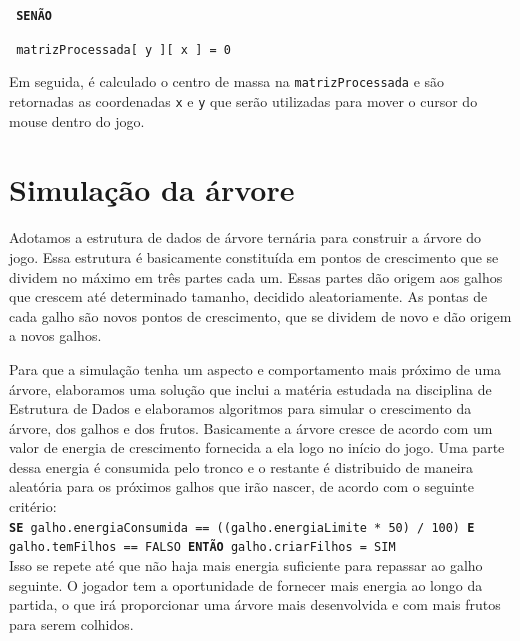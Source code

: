 \documentclass[12pt]{article}
\begin{document}
\hspace{0.1cm} \texttt{\footnotesize{ \textbf{SEN\~AO}}}

\hspace{0.3cm} \texttt{\footnotesize{ matrizProcessada[ y ][ x ] = 0}}


Em seguida, \'e calculado o centro de massa na \texttt{matrizProcessada} e s\~ao retornadas as coordenadas \texttt{x} e \texttt{y}
que ser\~ao utilizadas para mover o cursor do mouse dentro do jogo.

\section{Simula\c c\~ao da \'arvore}

Adotamos a estrutura de dados de \'arvore tern\'aria para construir a \'arvore do jogo. Essa estrutura \'e basicamente constitu\'ida
em pontos de crescimento que se dividem no m\'aximo em tr\^es partes cada um. Essas partes d\~ao origem aos galhos que crescem at\'e
determinado tamanho, decidido aleatoriamente. As pontas de cada galho s\~ao novos pontos de crescimento,
que se dividem de novo e d\~ao origem a novos galhos.

Para que a simula\c c\~ao tenha um aspecto e comportamento mais pr\'oximo de uma \'arvore, elaboramos uma solu\c c\~ao que inclui
a mat\'eria estudada na disciplina de Estrutura de Dados e elaboramos algoritmos para simular o crescimento da \'arvore,
dos galhos e dos frutos. Basicamente a \'arvore cresce de acordo com um valor de energia de crescimento fornecida
a ela logo no in\'icio do jogo. Uma parte dessa energia \'e consumida pelo tronco e o restante \'e distribuido
de maneira aleat\'oria para os pr\'oximos galhos que ir\~ao nascer, de acordo com o seguinte crit\'erio: \\

 \texttt{\footnotesize{\textbf{SE} galho.energiaConsumida == ((galho.energiaLimite * 50) / 100) \textbf{E} galho.temFilhos == FALSO 
        \textbf{ENT\~AO} galho.criarFilhos = SIM}} \\


Isso se repete at\'e que n\~ao haja mais energia suficiente
para repassar ao galho seguinte. O jogador tem a oportunidade de fornecer mais energia ao longo da partida, o que
ir\'a proporcionar uma \'arvore mais desenvolvida e com mais frutos para serem colhidos.
\end{document}
